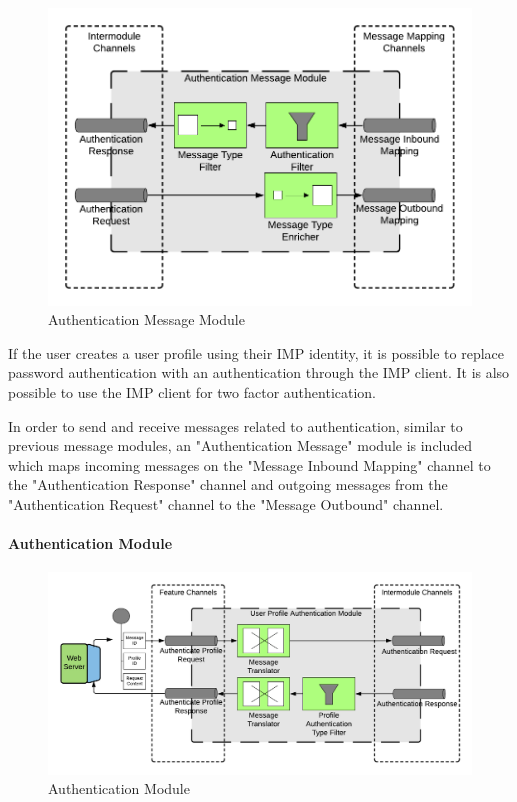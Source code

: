 \begin{figure}[h!]
    \centering
    \includegraphics[scale=0.6]{Diagrams/Integration Architecture 1/Technological Integration/16. Authenticatin Message Module.pdf}
    \caption{Authentication Message Module}
    \label{integration1:authentication_message_module}
\end{figure}

If the user creates a user profile using their IMP identity, it is possible to replace password authentication with an authentication through the IMP client. It is also possible to use the IMP client for two factor authentication.

In order to send and receive messages related to authentication, similar to previous message modules, an "Authentication Message" module is included which maps incoming messages on the "Message Inbound Mapping" channel to the "Authentication Response" channel and outgoing messages from the "Authentication Request" channel to the "Message Outbound" channel.

\paragraph{Authentication Module}

\begin{figure}[h!]
    \centering
    \includegraphics[scale=0.6]{Diagrams/Integration Architecture 1/Technological Integration/17. Authentication.pdf}
    \caption{Authentication Module}
    \label{integration1:authentication_module}
\end{figure}

